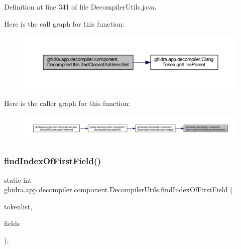 Definition at line 341 of file Decompiler\+Utils.\+java.

Here is the call graph for this function\+:
\nopagebreak
\begin{figure}[H]
\begin{center}
\leavevmode
\includegraphics[width=350pt]{classghidra_1_1app_1_1decompiler_1_1component_1_1_decompiler_utils_ac1c3357b8ea5189690396dbde0caca60_cgraph}
\end{center}
\end{figure}
Here is the caller graph for this function\+:
\nopagebreak
\begin{figure}[H]
\begin{center}
\leavevmode
\includegraphics[width=350pt]{classghidra_1_1app_1_1decompiler_1_1component_1_1_decompiler_utils_ac1c3357b8ea5189690396dbde0caca60_icgraph}
\end{center}
\end{figure}
\mbox{\label{classghidra_1_1app_1_1decompiler_1_1component_1_1_decompiler_utils_ae6bf8e2f218a0398cb90ce2826f16904}} 
\subsubsection{\texorpdfstring{findIndexOfFirstField()}{findIndexOfFirstField()}}
{\footnotesize\ttfamily static int ghidra.\+app.\+decompiler.\+component.\+Decompiler\+Utils.\+find\+Index\+Of\+First\+Field (\begin{DoxyParamCaption}\item[{\mbox{\hyperlink{xml_8hh_ab5ab62f46b3735557c125f91b40ac155}{List}}$<$ \mbox{\hyperlink{classghidra_1_1app_1_1decompiler_1_1_clang_token}{Clang\+Token}} $>$}]{tokenlist,  }\item[{Field \mbox{[}$\,$\mbox{]}}]{fields }\end{DoxyParamCaption})\hspace{0.3cm}{\ttfamily [inline]}, {\ttfamily [static]}}

